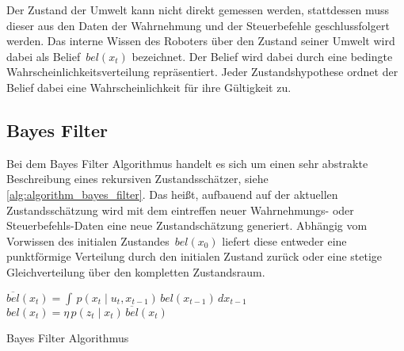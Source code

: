Der Zustand der Umwelt kann nicht direkt gemessen werden, stattdessen muss dieser aus den Daten der Wahrnehmung und der Steuerbefehle geschlussfolgert werden. Das interne Wissen des Roboters über den Zustand seiner Umwelt wird dabei als Belief~$bel(x_t)$ bezeichnet. Der Belief wird dabei durch eine bedingte Wahrscheinlichkeitsverteilung repräsentiert. Jeder Zustandshypothese ordnet der Belief dabei eine Wahrscheinlichkeit für ihre Gültigkeit zu.


%
%
\subsection{Bayes Filter}

Bei dem Bayes Filter Algorithmus handelt es sich um einen sehr abstrakte Beschreibung eines rekursiven Zustandsschätzer, siehe \autoref{alg:algorithm_bayes_filter}. Das heißt, aufbauend  auf der aktuellen Zustandsschätzung wird mit dem eintreffen neuer Wahrnehmungs- oder Steuerbefehls-Daten eine neue Zustandschätzung generiert. Abhängig vom Vorwissen des initialen Zustandes~$bel(x_0)$ liefert diese entweder eine punktförmige Verteilung durch den initialen Zustand zurück oder eine stetige Gleichverteilung über den kompletten Zustandsraum. 


\begin{algorithm}
\begin{onehalfspacing}
	\DontPrintSemicolon
	{
		{
			$\overline{bel}(x_t) = \int \, p(x_t \mid u_t, x_{t-1}) \, bel(x_{t-1}) \, dx_{t-1}$\;
			$bel(x_t) = \eta \, p(z_t \mid x_t) \, \overline{bel}(x_t)$\;
		}
	}
\caption{Bayes Filter Algorithmus}
\label{alg:algorithm_bayes_filter}
\end{onehalfspacing}
\end{algorithm}

